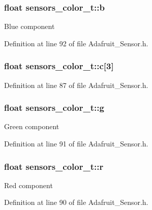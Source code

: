\subsubsection[{\texorpdfstring{b}{b}}]{\setlength{\rightskip}{0pt plus 5cm}float sensors\+\_\+color\+\_\+t\+::b}\hypertarget{structsensors__color__t_a1bf461b5c728e323f8883a3785c7c60b}{}\label{structsensors__color__t_a1bf461b5c728e323f8883a3785c7c60b}
Blue component 

Definition at line 92 of file Adafruit\+\_\+\+Sensor.\+h.

\subsubsection[{\texorpdfstring{c}{c}}]{\setlength{\rightskip}{0pt plus 5cm}float sensors\+\_\+color\+\_\+t\+::c\mbox{[}3\mbox{]}}\hypertarget{structsensors__color__t_a4d76803c2e83303f611cf2a7910eaf17}{}\label{structsensors__color__t_a4d76803c2e83303f611cf2a7910eaf17}


Definition at line 87 of file Adafruit\+\_\+\+Sensor.\+h.

\subsubsection[{\texorpdfstring{g}{g}}]{\setlength{\rightskip}{0pt plus 5cm}float sensors\+\_\+color\+\_\+t\+::g}\hypertarget{structsensors__color__t_ac91ecea980718cf134f60c497d2a0049}{}\label{structsensors__color__t_ac91ecea980718cf134f60c497d2a0049}
Green component 

Definition at line 91 of file Adafruit\+\_\+\+Sensor.\+h.

\subsubsection[{\texorpdfstring{r}{r}}]{\setlength{\rightskip}{0pt plus 5cm}float sensors\+\_\+color\+\_\+t\+::r}\hypertarget{structsensors__color__t_acdeed981e7df8c701e09d4b2fdb9a40c}{}\label{structsensors__color__t_acdeed981e7df8c701e09d4b2fdb9a40c}
Red component 

Definition at line 90 of file Adafruit\+\_\+\+Sensor.\+h.


